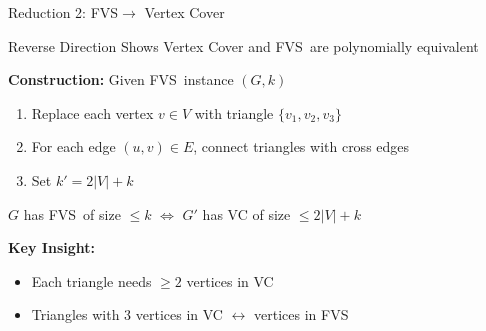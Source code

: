\documentclass[aspectratio=169]{beamer}
\newcommand{\fvs}{\textsc{FVS}}
\begin{document}
\begin{frame}{Reduction 2: \fvs $\rightarrow$ Vertex Cover}
  \begin{block}{Reverse Direction}
    Shows Vertex Cover and \fvs\ are polynomially equivalent
  \end{block}
  
  \vspace{0.3cm}
  
  \textbf{Construction:} Given \fvs\ instance $(G,k)$
  \begin{enumerate}
    \item Replace each vertex $v \in V$ with triangle $\{v_1, v_2, v_3\}$
    \item For each edge $(u,v) \in E$, connect triangles with cross edges
    \item Set $k' = 2|V| + k$
  \end{enumerate}
  
  \vspace{0.3cm}
  
  \begin{theorem}
    $G$ has \fvs\ of size $\leq k$ $\Leftrightarrow$ $G'$ has VC of size $\leq 2|V| + k$
  \end{theorem}
  
  \textbf{Key Insight:} 
  \begin{itemize}
	\item Each triangle needs $\ge 2$ vertices in VC
	\item Triangles with 3 vertices in VC $\leftrightarrow$ vertices in \fvs
  \end{itemize}
\end{frame}
\end{document}
